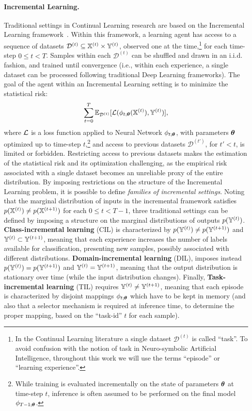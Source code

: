 \paragraph{Incremental Learning.}
Traditional settings in Continual Learning research are based on the Incremental Learning framework~\cite{de2021continual}. Within this framework, a learning agent has access to a sequence of datasets $\mathcal{D}^{(t)} \subseteq {\mathbb{X}}^{(t)} \times {\mathbb{Y}}^{(t)}$, observed one at the time,\footnote{In the Continual Learning literature a single dataset $\mathcal{D}^{(t)}$ is called ``task''. To avoid confusion with the notion of task in Neuro-symbolic Artificial Intelligence, throughout this work we will use the terms ``episode'' or ``learning experience''.} for each time-step $0 \leq t < T$. Samples within each $\mathcal{D}^{(t)}$ can be shuffled and drawn in an i.i.d. fashion, and trained until convergence (i.e., within each experience, a single dataset can be processed following traditional Deep Learning frameworks).
The goal of the agent within an Incremental Learning setting is to minimize the statistical risk:
$$\sum\limits_{t=0}^T \mathbb{E}_{\mathcal{D}^{(t)}}[{\mathcal{L}}(\phi_{t;{\bm{\theta}}}({\mathbb{X}}^{(t)}), {\mathbb{Y}}^{(t)})],$$
where ${\mathcal{L}}$ is a loss function applied to Neural Network $\phi_{t;{\bm{\theta}}}$, with parameters ${\bm{\theta}}$ optimized up to  time-step $t$,\footnote{While training is evaluated incrementally on the state of parameters ${\bm{\theta}}$ at time-step $t$, inference is often assumed to be performed on the final model $\phi_{T-1;{\bm{\theta}}}$.} and access to previous datasets $\mathcal{D}^{(t')}$, for $t' < t$, is limited or forbidden.
Restricting access to previous datasets makes the estimation of the statistical risk and its optimization challenging, as the empirical risk associated with a single dataset becomes an unreliable proxy of the entire distribution.
By imposing restrictions on the structure of the Incremental Learning problem, it is possible to define \textit{families of incremental settings}. Noting that the marginal distribution of inputs in the incremental framework satisfies $p({\mathbb{X}}^{(t)}) \not = p({\mathbb{X}}^{(t+1)})$ for each $0 \leq t < T-1$, three traditional settings can be defined by imposing a structure on the marginal distributions of outputs $p({\mathbb{Y}}^{(t)})$.
\textbf{Class-incremental learning} (CIL) is characterized by $p({\mathbb{Y}}^{(t)}) \not = p({\mathbb{Y}}^{(t+1)})$ and ${\mathbb{Y}}^{(t)} \subset {\mathbb{Y}}^{(t+1)}$, meaning that each experience increases the number of labels available for classification, presenting new samples, possibly associated with different distributions.
\textbf{Domain-incremental learning} (DIL), imposes instead $p({\mathbb{Y}}^{(t)}) = p({\mathbb{Y}}^{(t+1)})$ and ${\mathbb{Y}}^{(t)} = {\mathbb{Y}}^{(t+1)}$, meaning that the output distribution is stationary over time (while the input distribution changes).
Finally, \textbf{Task-incremental learning} (TIL) requires ${\mathbb{Y}}^{(t)} \not = {\mathbb{Y}}^{(t+1)}$, meaning that each episode is characterized by disjoint mappings $\phi_{t;{\bm{\theta}}}$ which have to be kept in memory (and also that a selector mechanism is required at inference time, to determine the proper mapping, based on the ``task-id'' $t$ for each sample).

